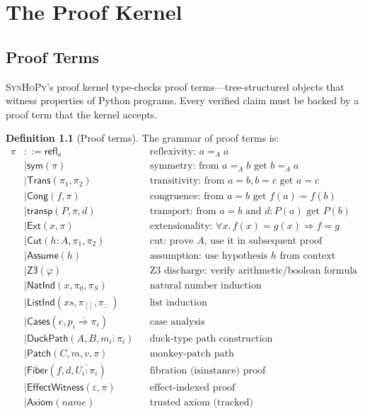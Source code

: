 \documentclass[11pt,a4paper]{report}
\theoremstyle{definition}
\newtheorem{definition}{Definition}[chapter]
\theoremstyle{plain}
\newcommand{\transp}{\mathsf{transp}}
\newcommand{\Refl}{\mathsf{refl}}
\newcommand{\sym}{\mathsf{sym}}
\newcommand{\Ext}{\mathsf{Ext}}
\newcommand{\Cut}{\mathsf{Cut}}
\newcommand{\Assume}{\mathsf{Assume}}
\newcommand{\Trans}{\mathsf{Trans}}
\newcommand{\Cong}{\mathsf{Cong}}
\newcommand{\synhopy}{\textsc{SynHoPy}}
\begin{document}
\chapter{The Proof Kernel}
\label{ch:kernel}

\section{Proof Terms}

\synhopy{}'s proof kernel type-checks proof terms---tree-structured objects that
witness properties of Python programs. Every verified claim must be backed by a
proof term that the kernel accepts.

\begin{definition}[Proof terms]
\label{def:proof-terms}
The grammar of proof terms is:
\begin{align}
  \pi &::= \Refl_a && \text{reflexivity: $a =_A a$} \\
  &\mid \sym(\pi) && \text{symmetry: from $a =_A b$ get $b =_A a$} \\
  &\mid \Trans(\pi_1, \pi_2) && \text{transitivity: from $a = b, b = c$ get $a = c$} \\
  &\mid \Cong(f, \pi) && \text{congruence: from $a = b$ get $f(a) = f(b)$} \\
  &\mid \transp(P, \pi, d) && \text{transport: from $a = b$ and $d : P(a)$ get $P(b)$} \\
  &\mid \Ext(x, \pi) && \text{extensionality: $\forall x.\, f(x) = g(x) \Rightarrow f = g$} \\
  &\mid \Cut(h : A, \pi_1, \pi_2) && \text{cut: prove $A$, use it in subsequent proof} \\
  &\mid \Assume(h) && \text{assumption: use hypothesis $h$ from context} \\
  &\mid \mathsf{Z3}(\varphi) && \text{Z3 discharge: verify arithmetic/boolean formula} \\
  &\mid \mathsf{NatInd}(x, \pi_0, \pi_S) && \text{natural number induction} \\
  &\mid \mathsf{ListInd}(xs, \pi_{[]}, \pi_{::}) && \text{list induction} \\
  &\mid \mathsf{Cases}(e, \overline{p_i \Rightarrow \pi_i}) && \text{case analysis} \\
  &\mid \mathsf{DuckPath}(A, B, \overline{m_i : \pi_i}) && \text{duck-type path construction} \\
  &\mid \mathsf{Patch}(C, m, v, \pi) && \text{monkey-patch path} \\
  &\mid \mathsf{Fiber}(f, d, \overline{U_i : \pi_i}) && \text{fibration (isinstance) proof} \\
  &\mid \mathsf{EffectWitness}(\varepsilon, \pi) && \text{effect-indexed proof} \\
  &\mid \mathsf{Axiom}(\mathit{name}) && \text{trusted axiom (tracked)}
\end{align}
\end{definition}
\end{document}
